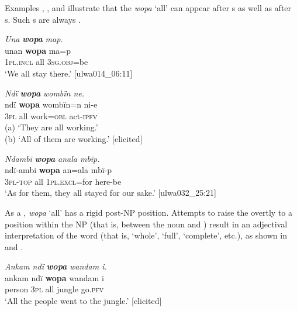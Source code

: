 Examples , , and  illustrate that the  \textit{wopa} ‘all’ can appear after s as well as after s. Such s are always .

\ea%
    \label{ex:det:169}
          \textit{Una} \textbf{\textit{wopa}} \textit{map.}\\
\gll    unan    \textbf{wopa}  ma=p\\
    1\textsc{pl.incl}  all    3\textsc{sg.obj}=be\\
\glt `We all stay there.’ [ulwa014\_06:11]
\z

\ea%
    \label{ex:det:170}
          \textit{Ndï} \textbf{\textit{wopa}} \textit{wombïn ne.}\\
\gll    ndï    \textbf{wopa}  wombïn=n  ni-e\\
    \textsc{3pl}    all    work=\textsc{obl}  act-\textsc{ipfv}\\
\glt    (a) ‘They are all working.’\\
    (b) ‘All of them are working.’ [elicited]
\z

\ea%
    \label{ex:det:171}
          \textit{Ndambi} \textbf{\textit{wopa}} \textit{anala mbïp.}\\
\gll    ndï-ambi  \textbf{wopa}  an=ala      mbï-p\\
    3\textsc{pl-top}  all    1\textsc{pl.excl}=for  here-be\\
\glt `As for them, they all stayed for our sake.’ [ulwa032\_25:21]
\z

As a , \textit{wopa} ‘all’ has a rigid post-NP position. Attempts to raise the  overtly to a position within the NP (that is, between the noun and ) result in an  adjectival interpretation of the word (that is, ‘whole’, ‘full’, ‘complete’, etc.), as shown in  and .

\ea%
    \label{ex:det:172}
          \textit{Ankam ndï} \textbf{\textit{wopa}} \textit{wandam i.}\\
\gll    ankam  ndï  \textbf{wopa}  wandam  i\\
    person  \textsc{3pl}  all    jungle    go.\textsc{pfv}\\
\glt `All the people went to the jungle.’ [elicited]
\z

\z

